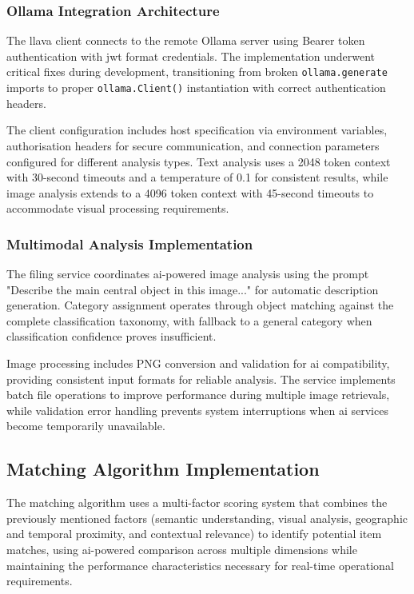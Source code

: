 \subsubsection{Ollama Integration Architecture}

The \ac{llava} client connects to the remote Ollama server using Bearer token authentication with \ac{jwt} format credentials. The implementation underwent critical fixes during development, transitioning from broken \texttt{ollama.generate} imports to proper \texttt{ollama.Client()} instantiation with correct authentication headers.


The client configuration includes host specification via environment variables, authorisation headers for secure communication, and connection parameters configured for different analysis types. Text analysis uses a 2048 token context with 30-second timeouts and a temperature of 0.1 for consistent results, while image analysis extends to a 4096 token context with 45-second timeouts to accommodate visual processing requirements.

\subsubsection{Multimodal Analysis Implementation}

The filing service coordinates \ac{ai}-powered image analysis using the prompt "Describe the main central object in this image..." for automatic description generation. Category assignment operates through object matching against the complete classification taxonomy, with fallback to a general category when classification confidence proves insufficient.

Image processing includes PNG conversion and validation for \ac{ai} compatibility, providing consistent input formats for reliable analysis. The service implements batch file operations to improve performance during multiple image retrievals, while validation error handling prevents system interruptions when \ac{ai} services become temporarily unavailable.

\subsection{Matching Algorithm Implementation} \label{subsection:matching_algorithm}

The matching algorithm uses a multi-factor scoring system that combines the previously mentioned factors (semantic understanding, visual analysis, geographic and temporal proximity, and contextual relevance) to identify potential item matches, using \ac{ai}-powered comparison across multiple dimensions while maintaining the performance characteristics necessary for real-time operational requirements.

